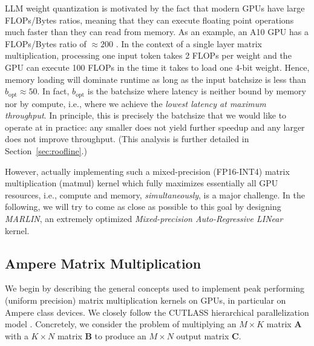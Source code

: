 \documentclass{article}
\theoremstyle{plain}
\theoremstyle{definition}
\theoremstyle{remark}
\newcommand{\htor}[1]{\textcolor{green}{[htor: #1]}}
\begin{document}
LLM weight quantization is motivated by the fact that modern GPUs have large FLOPs/Bytes ratios, meaning that they can execute floating point operations much faster than they can read from memory. As an example, an A10 GPU has a FLOPs/Bytes ratio of $\approx 200$ \cite{nvidia-a10}.
In the context of a single layer matrix multiplication, processing one input token takes 2 FLOPs per weight and the GPU can execute 100 FLOPs in the time it takes to load one 4-bit weight.
Hence, memory loading will dominate runtime as long as the input batchsize is less than $b_\text{opt} \approx 50$. In fact, $b_\text{opt}$ is the batchsize where latency is neither bound by memory nor by compute, i.e., where we achieve the \emph{lowest latency at maximum throughput}. In principle, this is precisely the batchsize that we would like to operate at in practice: any smaller does not yield further speedup and any larger does not improve throughput. 
(This analysis is further detailed in Section~\ref{sec:roofline}.) 

However, actually implementing such a mixed-precision (FP16-INT4) matrix multiplication (matmul) kernel which fully maximizes essentially all GPU resources, i.e., compute and memory, \emph{simultaneously}, is a major challenge. In the following, we will try to come as close as possible to this goal by designing \emph{MARLIN}, an extremely optimized \emph{Mixed-precision Auto-Regressive LINear} kernel. 


\subsection{Ampere Matrix Multiplication}

We begin by describing the general concepts used to implement peak performing (uniform precision) matrix multiplication kernels on GPUs, in particular on Ampere class devices. We closely follow the CUTLASS hierarchical parallelization model \cite{cutlass-gemm}. Concretely, we consider the problem of multiplying an $M \times K$ matrix $\mathbf{A}$ with a $K \times N$ matrix $\mathbf{B}$ to produce an $M \times N$ output matrix $\mathbf{C}$.
\end{document}
